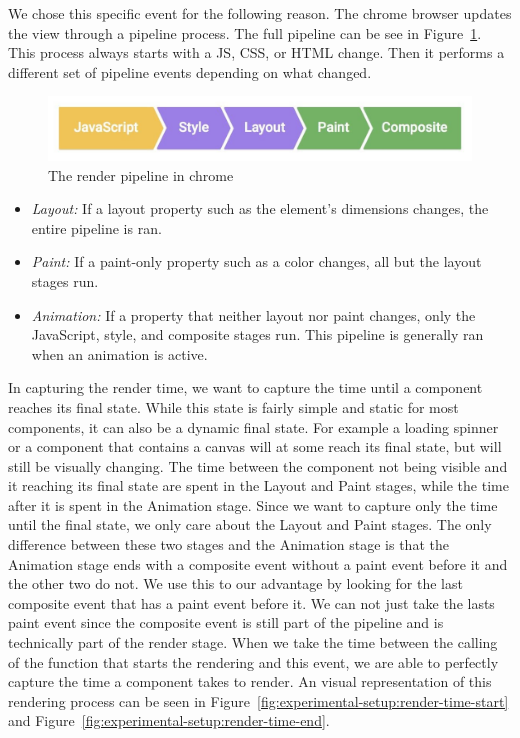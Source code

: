 We chose this specific event for the following reason. The chrome browser updates the view through a pipeline process. The full pipeline can be see in Figure~\ref{fig:experimental-setup:pipeline}. This process always starts with a JS, CSS, or HTML change. Then it performs a different set of pipeline events depending on what changed.

\begin{figure}[h]
	\includegraphics[width=\columnwidth]{figures/experimental-setup/render-pipeline.jpg}
	\caption{The render pipeline in chrome}
	\label{fig:experimental-setup:pipeline}
	\centering
\end{figure}

\begin{itemize}
	\item \emph{Layout:} If a layout property such as the element's dimensions changes, the entire pipeline is ran.
	\item \emph{Paint:} If a paint-only property such as a color changes, all but the layout stages run.
	\item \emph{Animation:} If a property that neither layout nor paint changes, only the JavaScript, style, and composite stages run. This pipeline is generally ran when an animation is active.
\end{itemize}

In capturing the render time, we want to capture the time until a component reaches its final state. While this state is fairly simple and static for most components, it can also be a dynamic final state. For example a loading spinner or a component that contains a canvas will at some reach its final state, but will still be visually changing. The time between the component not being visible and it reaching its final state are spent in the Layout and Paint stages, while the time after it is spent in the Animation stage. Since we want to capture only the time until the final state, we only care about the Layout and Paint stages. The only difference between these two stages and the Animation stage is that the Animation stage ends with a composite event without a paint event before it and the other two do not. We use this to our advantage by looking for the last composite event that has a paint event before it. We can not just take the lasts paint event since the composite event is still part of the pipeline and is technically part of the render stage. When we take the time between the calling of the function that starts the rendering and this event, we are able to perfectly capture the time a component takes to render. An visual representation of this rendering process can be seen in Figure~\ref{fig:experimental-setup:render-time-start} and Figure~\ref{fig:experimental-setup:render-time-end}.

